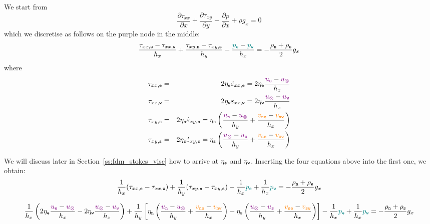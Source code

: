 We start from 
\[
\frac{\partial \tau_{xx}}{\partial x}  + 
\frac{\partial \tau_{xy}}{\partial y}  
- \frac{\partial p}{\partial x} + \rho g_x = 0
\]
which we discretise as follows on the purple node in the middle:
\[
\frac{\tau_{xx,{\tt e}}-\tau_{xx,{\tt w}}}{h_x} + \frac{\tau_{xy,{\tt n}}-\tau_{xy,{\tt s}}}{h_y} 
-\frac{{\color{teal}p_{\tt e}}-{\color{teal}p_{\tt w}}}{h_x} 
= -\frac{\rho_{\tt n}+\rho_{\tt s}}{2} g_x
\]
where
\begin{eqnarray}
\tau_{xx,{\tt e}} 
&=& 2 \eta_{\tt e} \dot{\varepsilon}_{xx,{\tt e}} 
= 2\eta_{\tt e} \frac{{\color{violet} u_{\tt e}}-{\color{violet} u_\otimes}}{h_x} \nonumber \\
\tau_{xx,{\tt w}} 
&=& 2 \eta_{\tt w} \dot{\varepsilon}_{xx,{\tt w}} 
= 2\eta_{\tt w} \frac{{\color{violet} u_\otimes}-{\color{violet} u_{\tt w}}}{h_x} \nonumber\\
\tau_{xy,{\tt n}} &=& 2 \eta_{\tt n} \dot{\varepsilon}_{xy,{\tt n}} 
= \eta_{\tt n} \left( \frac{{\color{violet} u_{\tt n}}-{\color{violet} u_\otimes}}{h_y} 
+\frac{{\color{orange} v_{\tt ne}}-{\color{orange} v_{\tt nw}}}{h_x} \right) \nonumber\\
\tau_{xy,{\tt s}} &=& 2 \eta_{\tt s} \dot{\varepsilon}_{xy,{\tt s}} 
= \eta_{\tt s} \left( \frac{{\color{violet} u_\otimes}-{\color{violet} u_{\tt s}}}{h_y} 
+\frac{{\color{orange}v_{\tt se}}-{\color{orange} v_{\tt sw}}}{h_x} \right)  \nonumber
\end{eqnarray}

We will discuss later in Section~\ref{ss:fdm_stokes_visc} how to arrive at $\eta_{\tt e}$ and $\eta_{\tt w}$.
Inserting the four equations above into the first one, we obtain:
\[
  \frac{1}{h_x} (\tau_{xx,{\tt e}}-\tau_{xx,{\tt w}}) 
+ \frac{1}{h_y} (\tau_{xy,{\tt n}}-\tau_{xy,{\tt s}})
-\frac{1}{h_x} {\color{teal}p_{\tt e}} + \frac{1}{h_x} {\color{teal}p_{\tt w}}
= -\frac{\rho_{\tt n}+\rho_{\tt s}}{2} g_x
\]

{\footnotesize
\[
\frac{1}{h_x} 
\left(  2\eta_{\tt e} \frac{{\color{violet} u_{\tt e}}-{\color{violet} u_\otimes}}{h_x} -  2\eta_{\tt w} \frac{{\color{violet} u_\otimes}-{\color{violet} u_{\tt w}}}{h_x}\right)
+ \frac{1}{h_y} \left[  
\eta_{\tt n} \left( \frac{{\color{violet} u_{\tt n}}-{\color{violet} u_\otimes}}{h_y} +\frac{{\color{orange} v_{\tt ne}}-{\color{orange} v_{\tt nw}}}{h_x} \right)
-
\eta_{\tt s} \left( \frac{{\color{violet} u_\otimes}-{\color{violet} u_{\tt s}}}{h_y} +\frac{{\color{orange} v_{\tt se}}-{\color{orange} v_{\tt sw}}}{h_x} \right) 
\right]
-\frac{1}{h_x} {\color{teal} p_{\tt e}} + \frac{1}{h_x}{\color{teal}p_{\tt w}}
= -\frac{\rho_{\tt n}+\rho_{\tt s}}{2} g_x
\]
}

